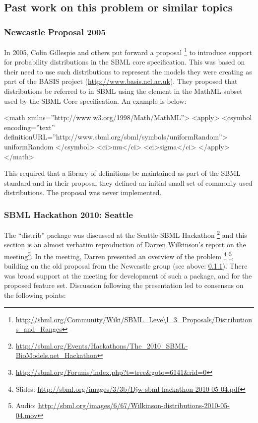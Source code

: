 \documentclass[draftspec]{sbmlpkgspec}
\newcommand{\mathml}{MathML\xspace}
\begin{document}
\subsection{Past work on this problem or similar topics}

\subsubsection{Newcastle Proposal 2005}
\label{sec:newcastle proposal}

In 2005, Colin Gillespie and others put forward a proposal
\footnote{\url{http://sbml.org/Community/Wiki/SBML\_Leve\l_3\_Proposals/Distributions\_and\_Ranges}}
to introduce support for probability distributions in the SBML core specification. This
was based on their need to use such distributions to represent the
models they were creating as part of the BASIS project
(\url{http://www.basis.ncl.ac.uk}).
They proposed that distributions be referred to in SBML using
the  element in the \mathml subset used by
the SBML Core specification. An example is below:

\begin{example}
<math xmlns=''http://www.w3.org/1998/Math/MathML''>
  <apply>
    <csymbol encoding=''text''
        definitionURL=''http://www.sbml.org/sbml/symbols/uniformRandom''>
      uniformRandom
    </csymbol>
    <ci>mu</ci>
    <ci>sigma</ci>
  </apply>
</math>
\end{example}

This required that a library of definitions be maintained as part of
the SBML standard and in their proposal they defined an initial small
set of commonly used distributions. The proposal was never
implemented.

\subsubsection{SBML Hackathon 2010: Seattle}

The ``distrib'' package was discussed at the Seattle SBML Hackathon%
\footnote{\url{http://sbml.org/Events/Hackathons/The_2010_SBML-BioModels.net_Hackathon}}
and this section is an almost verbatim reproduction of Darren
Wilkinson's report on the
meeting\footnote{\url{http://sbml.org/Forums/index.php?t=tree\&goto=6141\&rid=0}}. In the meeting,
Darren presented an overview of the problem%
\footnote{Slides: \url{http://sbml.org/images/3/3b/Djw-sbml-hackathon-2010-05-04.pdf}}%
\footnote{Audio: \url{http://sbml.org/images/6/67/Wilkinson-distributions-2010-05-04.mov}},
building on the old proposal from the Newcastle group (see above:
\ref{sec:newcastle proposal}).  There was broad support at the meeting
for development of such a package, and for the proposed feature
set. Discussion following the presentation led to consensus on the
following points:
\end{document}
